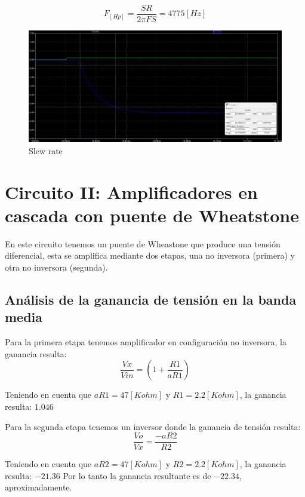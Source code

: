 \documentclass[12pt]{article}
\begin{document}
	\begin{equation}
		F_[Hp]=\frac{SR}{2\pi FS} = 4775[Hz]
	\end{equation} 
	
	\begin{figure}[h!]
		\includegraphics[width=\linewidth]{Imagenes_simulaciones/Sim_slow_rate}
		\caption[Slew rate]{Slew rate}
		\label{fig:simslowrate}
	\end{figure}
	
	\section{Circuito II: Amplificadores en cascada con puente de  Wheatstone }
	En este circuito tenemos un puente de Wheastone que produce una tensión diferencial, esta se amplifica mediante dos etapas, una no inversora (primera) y otra no inversora (segunda).
	
	\subsection{Análisis de la ganancia de tensión en la banda media}
	Para la primera etapa tenemos amplificador en configuración no inversora, la ganancia resulta:
	\begin{equation}
		\frac{Vx}{Vin}=(1+\frac{R1}{aR1})
	\end{equation}
	
	Teniendo en cuenta que $aR1=47[Kohm]$ y $R1=2.2[Kohm]$, la ganancia resulta: $1.046$
	
	Para la segunda etapa tenemos un inversor donde la ganancia de tensión resulta:
	\begin{equation}
		\frac{Vo}{Vx}= \frac{-aR2}{R2}
	\end{equation}
	
	Teniendo en cuenta que $aR2=47[Kohm]$ y $R2=2.2[Kohm]$, la ganancia resulta: $-21.36$
	Por lo tanto la ganancia resultante es de $-22.34$, aproximadamente.
	
\end{document}

